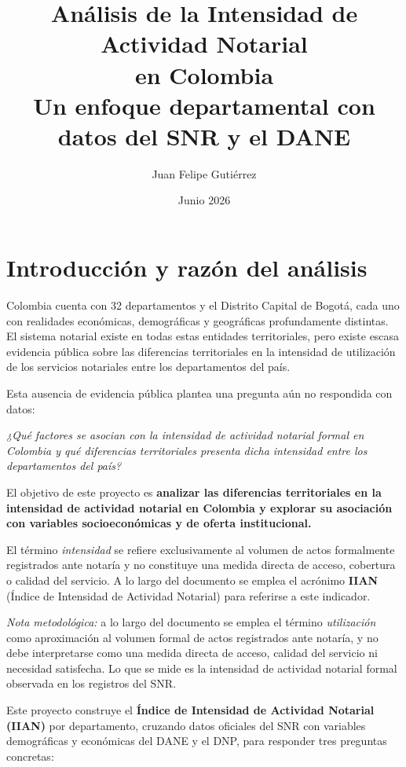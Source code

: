 \documentclass{article}
\title{\textbf{Análisis de la Intensidad de Actividad Notarial\\
en Colombia}\\
\large Un enfoque departamental con datos del SNR y el DANE}
\author{Juan Felipe Gutiérrez}
\date{Junio 2026}
\begin{document}
\maketitle
\tableofcontents
\newpage

\section{Introducción y razón del análisis}

Colombia cuenta con 32 departamentos y el Distrito Capital 
de Bogotá, cada uno con realidades económicas, demográficas 
y geográficas profundamente distintas. El sistema notarial 
existe en todas estas entidades territoriales, pero existe escasa evidencia pública sobre las diferencias territoriales en la intensidad de utilización de los servicios notariales entre los departamentos del país.

Esta ausencia de evidencia pública plantea una pregunta 
aún no respondida con datos:

\begin{center}
\textit{¿Qué factores se asocian con la intensidad de actividad notarial
formal en Colombia y qué diferencias territoriales presenta dicha
intensidad entre los departamentos del país?}
\end{center}

El objetivo de este proyecto es \textbf{analizar las diferencias
territoriales en la intensidad de actividad notarial en Colombia y
explorar su asociación con variables socioeconómicas y de oferta
institucional.}

\medskip
\noindent El término \emph{intensidad} se refiere exclusivamente
al volumen de actos formalmente registrados ante notaría y no
constituye una medida directa de acceso, cobertura o calidad del
servicio. A lo largo del documento se emplea el acrónimo
\textbf{IIAN} (Índice de Intensidad de Actividad Notarial) para
referirse a este indicador.

\medskip
\noindent\textit{Nota metodológica:} a lo largo del documento se emplea
el término \emph{utilización} como aproximación al volumen formal de
actos registrados ante notaría, y no debe interpretarse como una medida
directa de acceso, calidad del servicio ni necesidad satisfecha.
Lo que se mide es la intensidad de actividad notarial formal observada
en los registros del SNR.

Este proyecto construye el \textbf{Índice de Intensidad de Actividad
Notarial (IIAN)} por departamento, cruzando datos oficiales del SNR
con variables demográficas y económicas del DANE y el DNP, para
responder tres preguntas concretas:
\end{document}
